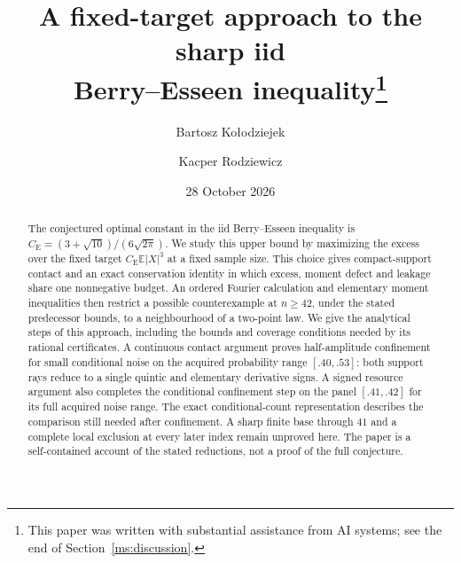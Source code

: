 \documentclass[11pt,a4paper]{article}
\title{A fixed-target approach to the sharp iid\\
Berry--Esseen inequality\thanks{This paper was written with substantial
assistance from AI systems; see the end of Section~\ref{ms:discussion}.}}
\author{Bartosz Ko{\l}odziejek \and Kacper Rodziewicz}
\date{28 October 2026}
\theoremstyle{definition}
\theoremstyle{remark}
\newcommand{\E}{\mathbb E}
\newcommand{\CE}{C_{\mathrm E}}
\begin{document}
\maketitle
\begin{abstract}
The conjectured optimal constant in the iid Berry--Esseen inequality is
$\CE=(3+\sqrt{10})/(6\sqrt{2\pi})$. We study this upper bound by maximizing
the excess over the fixed target $\CE\E|X|^3$ at a fixed sample size.
This choice gives compact-support contact and an exact conservation
identity in which excess, moment defect and leakage share one nonnegative
budget. An ordered Fourier calculation and elementary moment inequalities
then restrict a possible counterexample at $n\ge42$, under the stated
predecessor bounds, to a neighbourhood of a two-point law. We give the analytical steps of this approach, including the bounds
and coverage conditions needed by its rational certificates.
A continuous contact argument proves half-amplitude confinement for small
conditional noise on the acquired probability range $[.40,.53]$: both
support rays reduce to a single quintic and elementary derivative signs.
A signed resource argument also completes the conditional confinement step
on the panel $[.41,.42]$ for its full acquired noise range.
The exact conditional-count representation describes the comparison still
needed after confinement. A sharp finite base through $41$ and a complete
local exclusion at every later index remain unproved here. The paper is a
self-contained account of the stated reductions, not a proof of the full
conjecture.
\end{abstract}
\clearpage
\begingroup\small
\tableofcontents
\endgroup
\clearpage













\appendix
\setcounter{secnumdepth}{3}






\begingroup
\small\raggedright
{}


\endgroup
\end{document}
